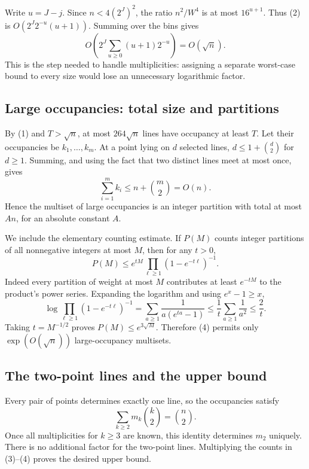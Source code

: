 Write $u=J-j$. Since $n<4(2^J)^2$, the ratio $n^2/W^4$ is at most $16^{u+1}$. Thus (2) is $O(2^J2^{-u}(u+1))$. Summing over the bins gives
\[
 O\left(2^J\sum_{u\geq0}(u+1)2^{-u}\right)=O(\sqrt n). \tag{3}
\]
This is the step needed to handle multiplicities: assigning a separate worst-case bound to every size would lose an unnecessary logarithmic factor.

\subsection*{Large occupancies: total size and partitions}
By (1) and $T>\sqrt n$, at most $264\sqrt n$ lines have occupancy at least $T$. Let their occupancies be $k_1,\ldots,k_m$. At a point lying on $d$ selected lines, $d\leq1+\binom d2$ for $d\geq1$. Summing, and using the fact that two distinct lines meet at most once, gives
\[
 \sum_{i=1}^m k_i\leq n+\binom m2=O(n). \tag{4}
\]
Hence the multiset of large occupancies is an integer partition with total at most $An$, for an absolute constant $A$.

We include the elementary counting estimate. If $P(M)$ counts integer partitions of all nonnegative integers at most $M$, then for any $t>0$,
\[
 P(M)\leq e^{tM}\prod_{\ell\geq1}(1-e^{-t\ell})^{-1}.
\]
Indeed every partition of weight at most $M$ contributes at least $e^{-tM}$ to the product's power series. Expanding the logarithm and using $e^x-1\geq x$,
\[
 \log\prod_{\ell\geq1}(1-e^{-t\ell})^{-1}
 =\sum_{a\geq1}\frac1{a(e^{ta}-1)}
 \leq\frac1t\sum_{a\geq1}\frac1{a^2}\leq\frac2t.
\]
Taking $t=M^{-1/2}$ proves $P(M)\leq e^{3\sqrt M}$. Therefore (4) permits only $\exp(O(\sqrt n))$ large-occupancy multisets.

\subsection*{The two-point lines and the upper bound}
Every pair of points determines exactly one line, so the occupancies satisfy
\[
 \sum_{k\geq2}m_k\binom k2=\binom n2.
\]
Once all multiplicities for $k\geq3$ are known, this identity determines $m_2$ uniquely. There is no additional factor for the two-point lines. Multiplying the counts in (3)--(4) proves the desired upper bound.

